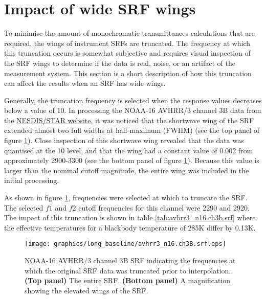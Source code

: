 \section{Impact of wide SRF wings}
To minimise the amount of monochromatic transmittances calculations that are required, the wings of instrument SRFs are truncated. The frequency at which this truncation occurs is somewhat subjective and requires visual inspection of the SRF wings to determine if the data is real, noise, or an artifact of the measurement system. This section is a short description of how this truncation can affect the results when an SRF has wide wings.

Generally, the truncation frequency is selected when the response values decreases below a value of 10. In processing the NOAA-16 AVHRR/3 channel 3B data from the \href{http://www.star.nesdis.noaa.gov/smcd/spb/fwu/solar_cal/spec_resp_func}{NESDIS/STAR website}, it was noticed that the shortwave wing of the SRF extended almost two full widths at half-maximum (FWHM) (see the top panel of figure \ref{fig:avhrr3_n16.ch3b.srf}). Close inspection of this shortwave wing revealed that the data was quantised at the 10 level, and that the wing had a constant value of 0.002 from approximately 2900-3300\invcm{} (see the bottom panel of figure \ref{fig:avhrr3_n16.ch3b.srf}). Because this value is larger than the nominal cutoff magnitude, the entire wing was included in the initial processing.

As shown in figure \ref{fig:avhrr3_n16.ch3b.srf}, frequencies were selected at which to truncate the SRF. The selected $f1$ and $f2$ cutoff frequencies for this channel were 2290\invcm{} and 2920\invcm{}. The impact of this truncation is shown in table \ref{tab:avhrr3_n16.ch3b.srf} where the effective temperatures for a blackbody temperature of 285K differ by 0.13K.

\begin{figure}[htp]
  \centering
  \texttt{[image: graphics/long\_baseline/avhrr3\_n16.ch3B.srf.eps]}
  \caption{NOAA-16 AVHRR/3 channel 3B SRF indicating the frequencies at which the original SRF data was truncated prior to interpolation. \textbf{(Top panel)} The entire SRF. \textbf{(Bottom panel)} A magnification showing the elevated wings of the SRF.}
  \label{fig:avhrr3_n16.ch3b.srf}
\end{figure}

